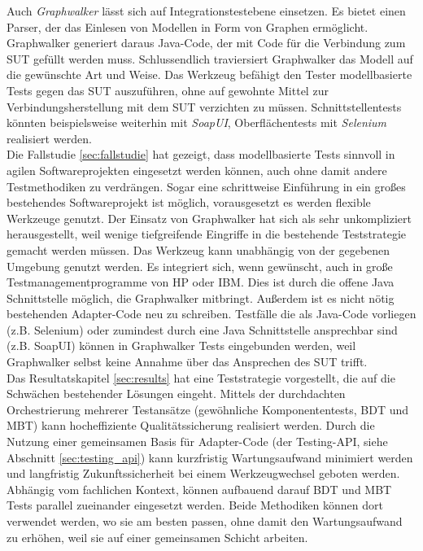 Auch \textit{Graphwalker} lässt sich auf Integrationstestebene einsetzen. Es bietet einen Parser, der das Einlesen von Modellen in Form von Graphen ermöglicht. Graphwalker generiert daraus Java-Code, der mit Code für die Verbindung zum \Gls{SUT} gefüllt werden muss. Schlussendlich traviersiert Graphwalker das Modell auf die gewünschte Art und Weise. Das Werkzeug befähigt den Tester modellbasierte Tests gegen das \Gls{SUT} auszuführen, ohne auf gewohnte Mittel zur Verbindungsherstellung mit dem \Gls{SUT} verzichten zu müssen. Schnittstellentests könnten beispielsweise weiterhin mit \textit{SoapUI}, Oberflächentests mit \textit{Selenium} realisiert werden.\\
Die Fallstudie \ref{sec:fallstudie}  hat gezeigt, dass modellbasierte Tests sinnvoll in agilen Softwareprojekten eingesetzt werden können, auch ohne damit andere Testmethodiken zu verdrängen. Sogar eine schrittweise Einführung in ein großes bestehendes Softwareprojekt ist möglich, vorausgesetzt es werden flexible Werkzeuge genutzt. Der Einsatz von Graphwalker hat sich als sehr unkompliziert herausgestellt, weil wenige tiefgreifende Eingriffe in die bestehende Teststrategie gemacht werden müssen. Das Werkzeug kann unabhängig von der gegebenen Umgebung genutzt werden. Es integriert sich, wenn gewünscht, auch in große Testmanagementprogramme von HP oder IBM. Dies ist durch die offene Java Schnittstelle möglich, die Graphwalker mitbringt. Außerdem ist es nicht nötig bestehenden Adapter-Code neu zu schreiben. Testfälle die als Java-Code vorliegen (z.B. Selenium) oder zumindest durch eine Java Schnittstelle ansprechbar sind (z.B. SoapUI) können in Graphwalker Tests eingebunden werden, weil Graphwalker selbst keine Annahme über das Ansprechen des \Gls{SUT} trifft.\\
Das Resultatskapitel \ref{sec:results} hat eine Teststrategie vorgestellt, die auf die Schwächen bestehender Lösungen eingeht. Mittels der durchdachten Orchestrierung mehrerer Testansätze (gewöhnliche Komponententests, \Gls{BDT} und \Gls{MBT}) kann hocheffiziente Qualitätssicherung realisiert werden. Durch die Nutzung einer gemeinsamen Basis für Adapter-Code (der Testing-API, siehe Abschnitt \ref{sec:testing_api}) kann kurzfristig Wartungsaufwand minimiert werden und langfristig Zukunftssicherheit bei einem Werkzeugwechsel geboten werden. 
Abhängig vom fachlichen Kontext, können aufbauend darauf \Gls{BDT} und \Gls{MBT} Tests parallel zueinander eingesetzt werden. Beide Methodiken können dort verwendet werden, wo sie am besten passen, ohne damit den Wartungsaufwand zu erhöhen, weil sie auf einer gemeinsamen Schicht arbeiten.\\

